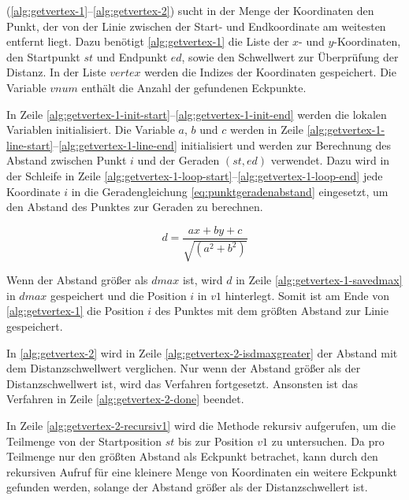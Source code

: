  (\autoref{alg:getvertex-1}--\autoref{alg:getvertex-2}) sucht in der Menge der Koordinaten den
 Punkt, der von der Linie zwischen der Start- und Endkoordinate am weitesten entfernt liegt. Dazu benötigt
 \autoref{alg:getvertex-1} die Liste der $x$- und $y$-Koordinaten, den Startpunkt $\mathit{st}$ und Endpunkt
 $\mathit{ed}$, sowie den Schwellwert zur Überprüfung der Distanz. In der Liste $\mathit{vertex}$ werden die Indizes
 der Koordinaten gespeichert. Die Variable $\mathit{vnum}$ enthält die Anzahl der gefundenen Eckpunkte.



In Zeile \ref{alg:getvertex-1-init-start}--\ref{alg:getvertex-1-init-end} werden die lokalen Variablen initialisiert.
 Die Variable $a$, $b$ und $c$ werden in Zeile \ref{alg:getvertex-1-line-start}--\ref{alg:getvertex-1-line-end}
 initialisiert und werden zur Berechnung des Abstand zwischen Punkt $i$ und der Geraden $(\mathit{st},\mathit{ed})$
 verwendet. Dazu wird in der Schleife in Zeile \ref{alg:getvertex-1-loop-start}--\ref{alg:getvertex-1-loop-end} jede
 Koordinate $i$ in die Geradengleichung \autoref{eq:punktgeradenabstand} eingesetzt, um den Abstand des Punktes zur
 Geraden zu berechnen.

\begin{equation}
	\label{eq:punktgeradenabstand}
	d = \frac{\mathit{ax} + \mathit{by} + c}{\sqrt{(a^2 + b^2)}}
\end{equation}

Wenn der Abstand größer als $\mathit{dmax}$ ist, wird $d$ in Zeile \ref{alg:getvertex-1-savedmax} in $\mathit{dmax}$
 gespeichert und die Position $i$ in $\mathit{v1}$ hinterlegt. Somit ist am Ende von \autoref{alg:getvertex-1} die
 Position $i$ des Punktes mit dem größten Abstand zur Linie gespeichert.

In \autoref{alg:getvertex-2} wird in Zeile \ref{alg:getvertex-2-isdmaxgreater} der Abstand mit dem Distanzschwellwert
 verglichen. Nur wenn der Abstand größer als der Distanzschwellwert ist, wird das Verfahren fortgesetzt. Ansonsten ist
 das Verfahren in Zeile \ref{alg:getvertex-2-done} beendet.



In Zeile \ref{alg:getvertex-2-recursiv1} wird die Methode  rekursiv aufgerufen, um die Teilmenge
 von der Startposition $\mathit{st}$ bis zur Position $\mathit{v1}$ zu untersuchen. Da  pro
 Teilmenge nur den größten Abstand als Eckpunkt betrachet, kann durch den rekursiven Aufruf für eine kleinere Menge von
 Koordinaten ein weitere Eckpunkt gefunden werden, solange der Abstand größer als der Distanzschwellert ist.

